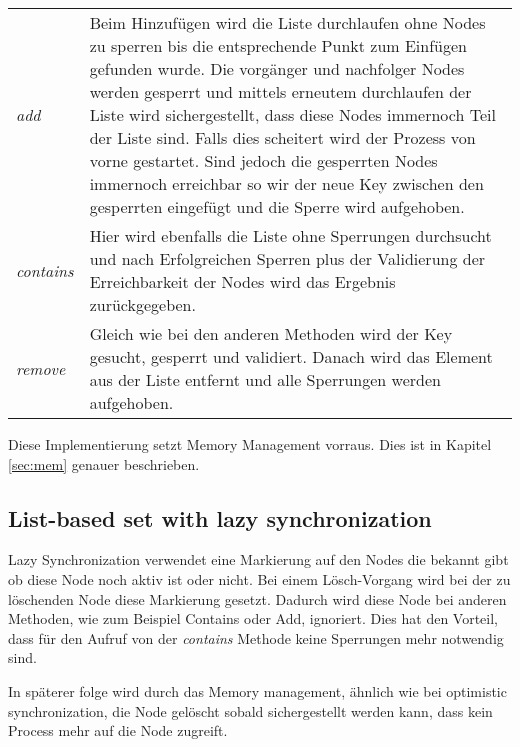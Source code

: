 \begin{table}[H]
    \begin{tabularx}{\textwidth}{lX}
        \textit{add} & Beim Hinzufügen wird die Liste durchlaufen ohne Nodes zu sperren bis die entsprechende Punkt zum Einfügen gefunden wurde. Die vorgänger und nachfolger Nodes werden gesperrt und mittels erneutem durchlaufen der Liste wird sichergestellt, dass diese Nodes immernoch Teil der Liste sind. Falls dies scheitert wird der Prozess von vorne gestartet. Sind jedoch die gesperrten Nodes immernoch erreichbar so wir der neue Key zwischen den gesperrten eingefügt und die Sperre wird aufgehoben.\\
        \textit{contains} & Hier wird ebenfalls die Liste ohne Sperrungen durchsucht und nach Erfolgreichen Sperren plus der Validierung der Erreichbarkeit der Nodes wird das Ergebnis zurückgegeben.\\
        \textit{remove} & Gleich wie bei den anderen Methoden wird der Key gesucht, gesperrt und validiert. Danach wird das Element aus der Liste entfernt und alle Sperrungen werden aufgehoben.\\
    \end{tabularx}
\end{table}

Diese Implementierung setzt Memory Management vorraus. Dies ist in Kapitel \ref{sec:mem} genauer beschrieben.

\subsection{List-based set with lazy synchronization}

Lazy Synchronization verwendet eine Markierung auf den Nodes die bekannt gibt ob diese Node noch aktiv ist oder nicht. Bei einem Lösch-Vorgang wird bei der zu löschenden Node diese Markierung gesetzt. Dadurch wird diese Node bei anderen Methoden, wie zum Beispiel Contains oder Add, ignoriert. Dies hat den Vorteil, dass für den Aufruf von der \textit{contains} Methode keine Sperrungen mehr notwendig sind.

In späterer folge wird durch das Memory management, ähnlich wie bei optimistic synchronization, die Node gelöscht sobald sichergestellt werden kann, dass kein Process mehr auf die Node zugreift.

